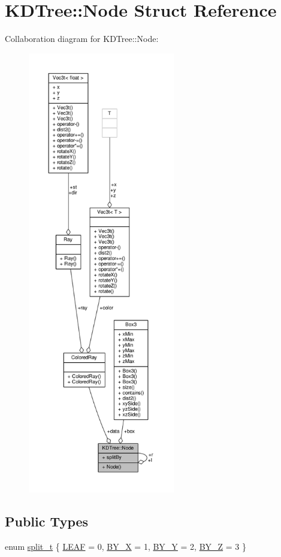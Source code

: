 \hypertarget{structKDTree_1_1Node}{}\section{K\+D\+Tree\+:\+:Node Struct Reference}
\label{structKDTree_1_1Node}


Collaboration diagram for K\+D\+Tree\+:\+:Node\+:\nopagebreak
\begin{figure}[H]
\begin{center}
\leavevmode
\includegraphics[height=550pt]{structKDTree_1_1Node__coll__graph}
\end{center}
\end{figure}
\subsection*{Public Types}
\begin{DoxyCompactItemize}
\item 
enum \hyperlink{structKDTree_1_1Node_ab21ae38de8fe0e25d29d0ae136a1db34}{split\+\_\+t} \{ \hyperlink{structKDTree_1_1Node_ab21ae38de8fe0e25d29d0ae136a1db34ae9e20517e320a257a7ec3aecb69427ec}{L\+E\+AF} = 0, 
\hyperlink{structKDTree_1_1Node_ab21ae38de8fe0e25d29d0ae136a1db34a36069e5e459835d23e1e4e2412f15f15}{B\+Y\+\_\+X} = 1, 
\hyperlink{structKDTree_1_1Node_ab21ae38de8fe0e25d29d0ae136a1db34a16bcf65fb5fef5f33c18e6de9022fd2d}{B\+Y\+\_\+Y} = 2, 
\hyperlink{structKDTree_1_1Node_ab21ae38de8fe0e25d29d0ae136a1db34a921306d44eb973ea0dffcff75817a095}{B\+Y\+\_\+Z} = 3
 \}
\end{DoxyCompactItemize}
